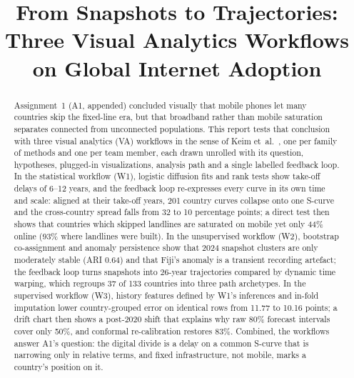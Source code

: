 \documentclass[conference,a4paper]{IEEEtran}
\begin{document}
\title{From Snapshots to Trajectories: Three Visual Analytics Workflows on Global Internet Adoption}

\author{
\and
{}
\and
{}
}
\maketitle

\begin{abstract}
Assignment~1 (A1, appended) concluded visually that mobile phones let many countries skip the
fixed-line era, but that broadband rather than mobile saturation separates connected from
unconnected populations. This report tests that conclusion with three visual analytics (VA)
workflows in the sense of Keim et~al.~\cite{keim2008scope}, one per family of methods and one per team
member, each drawn unrolled with its question, hypotheses, plugged-in visualizations, analysis path
and a single labelled feedback loop. In the statistical workflow (W1), logistic diffusion fits and
rank tests show take-off delays of 6--12 years, and the feedback loop re-expresses every curve in its
own time and scale: aligned at their take-off years, 201 country curves collapse onto one S-curve and
the cross-country spread falls from 32 to 10 percentage points; a direct test then shows that countries
which skipped landlines are saturated on mobile yet only 44\% online (93\% where landlines were built). In
the unsupervised workflow (W2),
bootstrap co-assignment and anomaly persistence show that 2024 snapshot clusters are only moderately
stable (ARI 0.64) and that Fiji's anomaly is a transient recording artefact; the feedback loop turns
snapshots into 26-year trajectories compared by dynamic time warping, which regroups 37 of 133
countries into three path archetypes. In the supervised workflow (W3), history features defined by
W1's inferences and in-fold imputation lower country-grouped error on identical rows from 11.77 to
10.16 points; a drift chart then shows a post-2020 shift that explains why raw 80\% forecast
intervals cover only 50\%, and conformal re-calibration restores 83\%. Combined, the workflows answer
A1's question: the digital divide is a delay on a common S-curve that is narrowing only in relative
terms, and fixed infrastructure, not mobile, marks a country's position on it.
\end{abstract}
\end{document}
